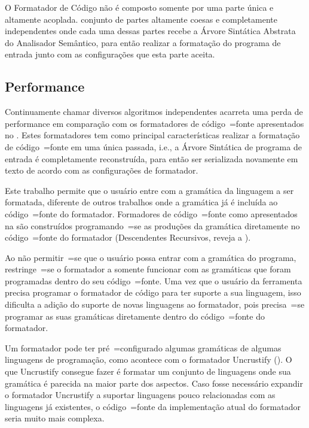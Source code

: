 O Formatador de Código não é composto somente por uma parte única e
altamente acoplada.
 conjunto de partes altamente coesas e
completamente independentes onde cada uma dessas partes recebe a Árvore Sintática Abstrata do Analisador Semântico,
para então realizar a formatação do programa de entrada junto com as configurações que esta parte aceita.


\subsection{Performance}
\label{performanceDoFormator}

Continuamente chamar diversos algoritmos independentes acarreta uma perda de performance em comparação com os formatadores de código~=fonte apresentados no .
Estes formatadores tem como principal características realizar a formatação de código~=fonte em uma única passada,
i.e.,
a Árvore Sintática de programa de entrada é completamente reconstruída,
para então ser serializada novamente em texto de acordo com as configurações de formatador.

Este trabalho permite que o usuário entre com a gramática da linguagem a ser formatada,
diferente de outros trabalhos onde a gramática já é incluída ao código~=fonte do formatador.
Formadores de código~=fonte como apresentados na  são construídos programando~=se as produções da gramática diretamente no código~=fonte do formatador (Descendentes Recursivos,
reveja a ).

Ao não permitir~=se que o usuário possa entrar com a gramática do programa,
restringe~=se o formatador a somente funcionar com as gramáticas que foram programadas dentro do seu código~=fonte.
Uma vez que o usuário da ferramenta precisa programar o formatador de código para ter suporte a sua linguagem,
isso dificulta a adição do suporte de novas linguagens ao formatador,
pois precisa~=se programar as suas gramáticas diretamente dentro do código~=fonte do formatador.

Um formatador pode ter pré~=configurado algumas gramáticas de algumas linguagens de programação,
como acontece com o formatador Uncrustify ().
O que Uncrustify consegue fazer é formatar um conjunto de linguagens onde sua gramática é parecida na maior parte dos aspectos.
Caso fosse necessário expandir o formatador Uncrustify a suportar linguagens pouco relacionadas com as linguagens já existentes,
o código~=fonte da implementação atual do formatador seria muito mais complexa.


